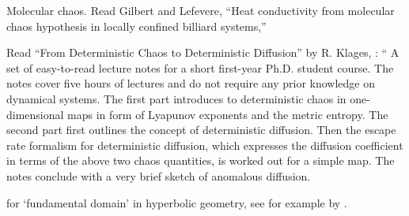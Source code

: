 {Molecular chaos.}{ Read Gilbert and Lefevere, ``Heat
  conductivity from molecular chaos hypothesis in locally confined
  billiard systems,'' } %

Read ``From Deterministic Chaos to Deterministic Diffusion'' by
R. Klages, : `` A set of easy-to-read lecture notes
for a short first-year Ph.D.  student course. The notes cover five
hours of lectures and do not require any prior knowledge on dynamical
systems. The first part introduces to deterministic chaos in
one-dimensional maps in form of Lyapunov exponents and the metric
entropy. The second part first outlines the concept of deterministic
diffusion. Then the escape rate formalism for deterministic diffusion,
which expresses the diffusion coefficient in terms of the above two
chaos quantities, is worked out for a simple map. The notes conclude
with a very brief sketch of anomalous diffusion.

{for `fundamental domain' in hyperbolic geometry, see for example
   by
  .  }
